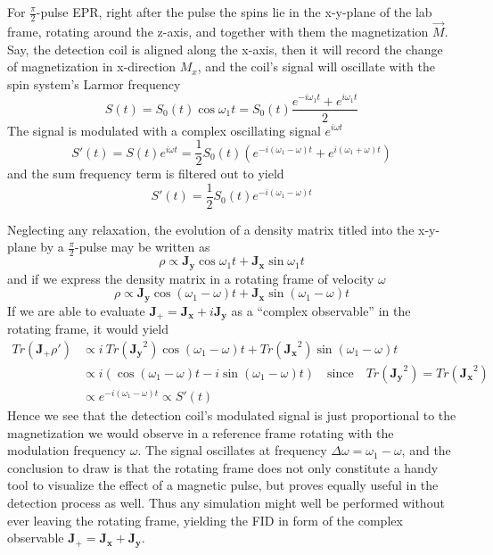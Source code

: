 \documentclass[11.5pt,a4paper]{article}
\begin{document}
For $\tfrac{\pi}{2}$-pulse EPR, right after the pulse the spins lie in the x-y-plane of the lab frame, rotating around the z-axis, and together with them the magnetization $\vec{M}$. Say, the detection coil is aligned along the x-axis, then it will record the change of magnetization in x-direction $M_x$, and the coil's signal will oscillate with the spin system's Larmor frequency
\begin{equation}
 S(t) = S_0(t) \cos \omega_1 t = S_0(t)  \frac{e^{-i \omega_1 t} + e^{i \omega_1 t}}{2}
\end{equation}
The signal is modulated with a complex oscillating signal $e^{i\omega t}$
\begin{equation}
 S'(t) = S(t) e^{i\omega t} = \frac{1}{2} S_0(t) \left( e^{-i (\omega_1-\omega) t} + e^{i (\omega_1+\omega) t} \right)
\end{equation}
and the sum frequency term is filtered out to yield
\begin{equation}
 S'(t) =\frac{1}{2} S_0(t) e^{-i (\omega_1-\omega) t}
\end{equation}


Neglecting any relaxation, the evolution of a density matrix titled into the x-y-plane by a $\tfrac{\pi}{2}$-pulse may be written as 
\begin{equation}
 \rho \propto \mathbf{J_y} \cos \omega_1 t + \mathbf{J_x} \sin \omega_1 t
\end{equation}
and if we express the density matrix in a rotating frame of velocity $\omega$
\begin{equation}
 \rho \propto \mathbf{J_y} \cos (\omega_1-\omega) t + \mathbf{J_x} \sin (\omega_1-\omega) t
\end{equation}
If we are able to evaluate $\mathbf{J_+} = \mathbf{J_x} + i \mathbf{J_y}$ as a ``complex observable'' in the rotating frame, it would yield
\begin{align}
 Tr( \mathbf{J_+} \rho' ) & \propto i\ Tr(\mathbf{J_y}^2) \cos (\omega_1-\omega) t + Tr(\mathbf{J_x}^2) \sin (\omega_1-\omega) t \\
& \propto i ( \cos (\omega_1-\omega) t - i \sin (\omega_1-\omega) t ) \quad \text{since} \quad Tr(\mathbf{J_y}^2) = Tr(\mathbf{J_x}^2) \\
& \propto e^{-i (\omega_1-\omega) t} \propto S'(t)
\end{align}
Hence we see that the detection coil's modulated signal is just proportional to the magnetization we would observe in a reference frame rotating with the modulation frequency $\omega$. The signal oscillates at frequency $\Delta \omega = \omega_1 - \omega$, and the conclusion to draw is that the rotating frame does not only constitute a handy tool to visualize the effect of a magnetic pulse, but proves equally useful in the detection process as well. Thus any simulation might well be performed without ever leaving the rotating frame, yielding the FID in form of the complex observable $\mathbf{J_+} = \mathbf{J_x} + \mathbf{J_y}$.
\end{document}
